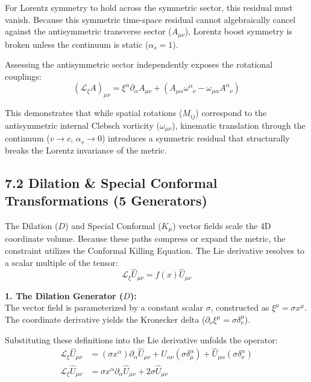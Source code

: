For Lorentz symmetry to hold across the symmetric sector, this residual must vanish. Because this symmetric time-space residual cannot algebraically cancel against the antisymmetric transverse sector ($A_{\mu\nu}$), Lorentz boost symmetry is broken unless the continuum is static ($\alpha_s = 1$). 

Assessing the antisymmetric sector independently exposes the rotational couplings:
\begin{equation}
    (\mathcal{L}_\xi A)_{\mu\nu} = \xi^\alpha \partial_\alpha A_{\mu\nu} + (A_{\mu\alpha}\omega^\alpha_{\phantom{\alpha}\nu} - \omega_{\mu\alpha}A^\alpha_{\phantom{\alpha}\nu})
\end{equation}

This demonstrates that while spatial rotations ($M_{ij}$) correspond to the antisymmetric internal Clebsch vorticity ($\omega_{\mu\nu}$), kinematic translation through the continuum ($v \to c$, $\alpha_s \to 0$) introduces a symmetric residual that structurally breaks the Lorentz invariance of the metric.

\subsection*{7.2 Dilation \& Special Conformal Transformations (5 Generators)}
The Dilation ($D$) and Special Conformal ($K_\mu$) vector fields scale the 4D coordinate volume. Because these paths compress or expand the metric, the constraint utilizes the Conformal Killing Equation. The Lie derivative resolves to a scalar multiple of the tensor:
\begin{equation}
    \mathcal{L}_\xi \hat{U}_{\mu\nu} = f(x) \hat{U}_{\mu\nu} \label{eq:conformal_killing}
\end{equation}

\textbf{1. The Dilation Generator ($D$):} \\
The vector field is parameterized by a constant scalar $\sigma$, constructed as $\xi^\mu = \sigma x^\mu$. The coordinate derivative yields the Kronecker delta ($\partial_\nu \xi^\mu = \sigma \delta^\mu_\nu$).

Substituting these definitions into the Lie derivative unfolds the operator:
\begin{align}
    \mathcal{L}_\xi \hat{U}_{\mu\nu} &= (\sigma x^\alpha) \partial_\alpha \hat{U}_{\mu\nu} + \hat{U}_{\alpha\nu} (\sigma \delta^\alpha_\mu) + \hat{U}_{\mu\alpha} (\sigma \delta^\alpha_\nu) \nonumber \\
    \mathcal{L}_\xi \hat{U}_{\mu\nu} &= \sigma x^\alpha \partial_\alpha \hat{U}_{\mu\nu} + 2\sigma \hat{U}_{\mu\nu} \label{eq:dilation_expansion}
\end{align}


